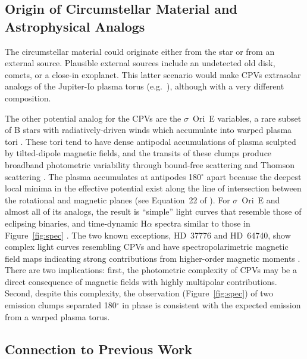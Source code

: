\documentclass[11pt,twocolumn,tighten,linenumbers]{aastex7}
\begin{document}
\subsection{Origin of Circumstellar Material and Astrophysical Analogs}

The circumstellar material could originate either from the star or
from an external source.  Plausible external sources include an
undetected old disk, comets, or a close-in exoplanet.  This latter
scenario would make CPVs extrasolar analogs of the Jupiter-Io plasma
torus (e.g.~\citealt{Bagenal1981}), although with a very different
composition.

The other potential analog for the CPVs are the $\sigma$~Ori~E
variables, a rare subset of B stars with radiatively-driven winds
which accumulate into warped plasma tori
\citep{Townsend2005,Townsend2008}.  These tori tend to have dense
antipodal accumulations of plasma sculpted by tilted-dipole magnetic
fields, and the transits of these clumps produce broadband photometric
variability through bound-free scattering \citep{Townsend2005} and
Thomson scattering \citep{Berry2022}.  The plasma accumulates at
antipodes 180$^\circ$ apart because the deepest local minima in the
effective potential exist along the line of intersection between the
rotational and magnetic planes (see Equation~22 of
\citealt{Townsend2005}).  For $\sigma$~Ori~E and almost all of its
analogs, the result is ``simple'' light curves that resemble those of
eclipsing binaries, and time-dynamic H$\alpha$ spectra similar to
those in Figure~\ref{fig:spec} \citep{Townsend2005,Townsend2008}.  The
two known exceptions, HD~37776 and HD~64740, show complex light curves
resembling CPVs \citep{Mikulasek2020,Bouma2024} and have
spectropolarimetric magnetic field maps indicating strong
contributions from higher-order magnetic moments
\citep{Kochukhov2011,Shultz2018}.  There are two implications: first,
the photometric complexity of CPVs may be a direct consequence of
magnetic fields with highly multipolar contributions.  Second, despite
this complexity, the observation (Figure~\ref{fig:spec}) of two
emission clumps separated 180$^\circ$ in phase is consistent with the
expected emission from a warped plasma torus.


\subsection{Connection to Previous Work}
\end{document}
